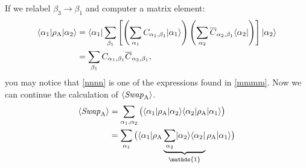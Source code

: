 If we relabel $\beta_3 \rightarrow \beta_1$ and computer a matrix element:
\begin{align}
	\langle {\alpha_1} \rvert\rho_{\rm A} \lvert {\alpha_2} \rangle
	&=   \langle {\alpha_1} \rvert\sum_{\beta_1}  \left[ \left(\sum_{\alpha_1} 
		C_{\alpha_1,\beta_1}\lvert {\alpha_1} \rangle\right)
		\left(\sum_{\alpha_2} 
		\overline{C}_{\alpha_2,\beta_1}\langle {\alpha_2} \rvert\right) \right] \lvert {\alpha_2} \rangle \\
	&= \sum_{\beta_1} C_{\alpha_1,\beta_1} \overline{C}_{\alpha_2,\beta_1} \label{nnnn},
\end{align}
you may notice that \eqref{nnnn} is one of the expressions found in \eqref{mmmm}.
Now we can continue the calculation of $\langle {\it Swap}_{\rm A} \rangle$.
\begin{align}
\langle \SWA \rangle &= \sum_{\alpha_1,\alpha_2} \big( \bra{\alpha_1}\rho_{\rm A} \ket{\alpha_2} 
					\bra{\alpha_2}\rho_{\rm A} \ket{\alpha_1}\big) \\
	&= \sum_{\alpha_1} \big( \bra{\alpha_1}\rho_{\rm A} 
				\underbrace{\sum_{\alpha_2} \ket{\alpha_2}\bra{\alpha_2}}_{\mathds{1}}
				\rho_{\rm A} \ket{\alpha_1}\big)
\end{align}
